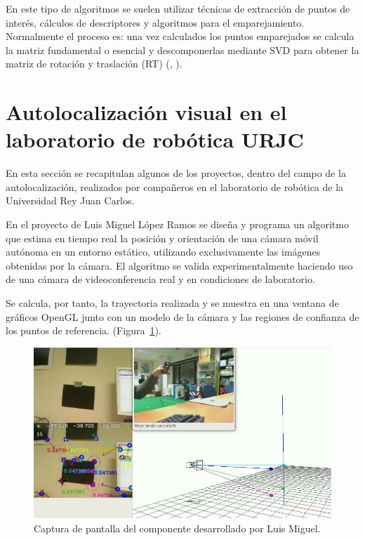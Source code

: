 En este tipo de algoritmos se suelen utilizar técnicas de extracción de puntos de interés, cálculos de descriptores y algoritmos para el emparejamiento. Normalmente el proceso es: una vez calculados los puntos emparejados se calcula la matriz fundamental o esencial y descomponerlas mediante SVD para obtener la matriz de rotación y traslación (RT) (\cite{Reference3}, \cite{Reference4}).

\section{Autolocalización visual en el laboratorio de robótica URJC}

En esta sección se recapitulan algunos de los proyectos, dentro del campo de la autolocalización, realizados por compañeros en el laboratorio de robótica de la Universidad Rey Juan Carlos.

En el proyecto de Luis Miguel López Ramos \parencite{ref1} se diseña y programa un algoritmo que estima en tiempo real la posición y orientación de una cámara móvil autónoma en un entorno estático, utilizando exclusivamente las imágenes obtenidas por la cámara. El algoritmo se valida experimentalmente haciendo uso de una cámara de videoconferencia real y en condiciones de laboratorio.

Se calcula, por tanto, la trayectoria realizada y se muestra en una ventana de gráficos OpenGL junto con un modelo de la cámara y las regiones de confianza de los puntos de referencia. (Figura~\ref{fig:ramos}).

\begin{figure}[th]
\centering
\includegraphics[scale=0.463]{Figures/cap-ramos.png}
\decoRule
\caption[Captura de pantalla, PFC de Luis Miguel]{Captura de pantalla del componente desarrollado por Luis Miguel.}
\label{fig:ramos}
\end{figure}

